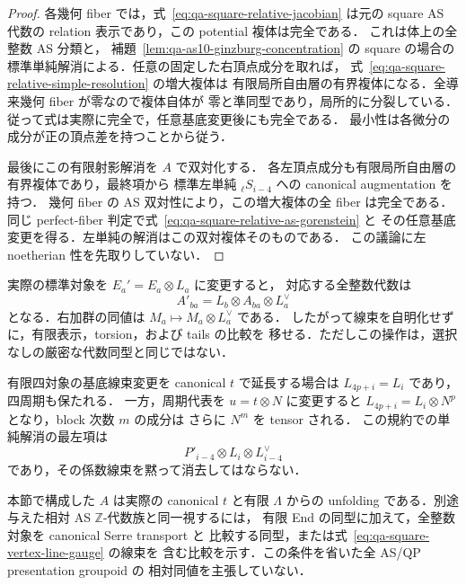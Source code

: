 \begin{proof}
各幾何 fiber では，式~\eqref{eq:qa-square-relative-jacobian} は元の
square AS 代数の relation 表示であり，この potential 複体は完全である．
これは体上の全整数 AS 分類と，
補題~\ref{lem:qa-as10-ginzburg-concentration} の square の場合の
標準単純解消による．任意の固定した右頂点成分を取れば，
式~\eqref{eq:qa-square-relative-simple-resolution} の増大複体は
有限局所自由層の有界複体になる．全導来幾何 fiber が零なので複体自体が
零と準同型であり，局所的に分裂している．
従って式は実際に完全で，任意基底変更後にも完全である．
最小性は各微分の成分が正の頂点差を持つことから従う．

最後にこの有限射影解消を $A$ で双対化する．
各左頂点成分も有限局所自由層の有界複体であり，最終項から
標準左単純 ${}_\ell S_{i-4}$ への canonical augmentation を持つ．
幾何 fiber の AS 双対性により，この増大複体の全 fiber は完全である．
同じ perfect-fiber 判定で式~\eqref{eq:qa-square-relative-as-gorenstein} と
その任意基底変更を得る．左単純の解消はこの双対複体そのものである．
この議論に左 noetherian 性を先取りしていない．
\end{proof}

\begin{remark}[頂点線束と周期の標識]
\label{rem:qa-square-unfolding-vertex-lines}
実際の標準対象を $E_a'=E_a\otimes L_a$ に変更すると，
対応する全整数代数は
\[
 A'_{ba}=L_b\otimes A_{ba}\otimes L_a^{\vee}
 \tag{VG}\label{eq:qa-square-vertex-line-gauge}
\]
となる．右加群の同値は $M_a\mapsto M_a\otimes L_a^{\vee}$ である．
したがって線束を自明化せずに，有限表示，torsion，および tails の比較を
移せる．ただしこの操作は，選択なしの厳密な代数同型と同じではない．

有限四対象の基底線束変更を canonical $t$ で延長する場合は
$L_{4p+i}=L_i$ であり，四周期も保たれる．
一方，周期代表を $u=t\otimes N$ に変更すると
$L_{4p+i}=L_i\otimes N^p$ となり，block 次数 $m$ の成分は
さらに $N^m$ を tensor される．
この規約での単純解消の最左項は
\[
 P'_{i-4}\otimes L_i\otimes L_{i-4}^{\vee}
\]
であり，その係数線束を黙って消去してはならない．

本節で構成した $A$ は実際の canonical $t$ と有限 $\Lambda$ からの
unfolding である．別途与えた相対 AS $\mathbb Z$-代数族と同一視するには，
有限 End の同型に加えて，全整数対象を canonical Serre transport と
比較する同型，または式~\eqref{eq:qa-square-vertex-line-gauge} の線束を
含む比較を示す．この条件を省いた全 AS/QP presentation groupoid の
相対同値を主張していない．
\end{remark}

